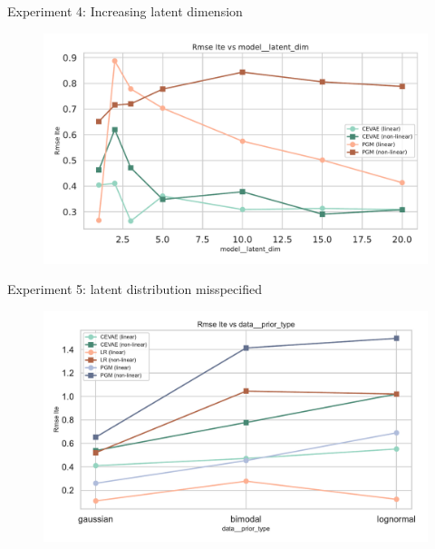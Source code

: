 \documentclass[10pt]{beamer}
\begin{document}
\begin{frame}{Experiment 4: Increasing latent dimension}
    \begin{figure}[H]
      \includegraphics[width=\textwidth]{images/MyRun_model__latent_dim--rmse_ite.pdf}
    \end{figure}
\end{frame}

\begin{frame}{Experiment 5: latent distribution misspecified}
    \begin{figure}[H]
      \includegraphics[width=\textwidth]{images/MyRun_data__prior_type--rmse_ite.pdf}
    \end{figure}
\end{frame}
\end{document}
